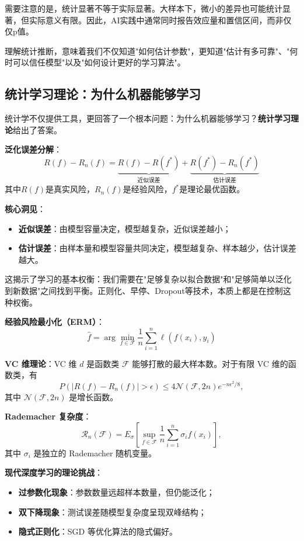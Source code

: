 需要注意的是，统计显著不等于实际显著。大样本下，微小的差异也可能统计显著，但实际意义有限。因此，AI实践中通常同时报告效应量和置信区间，而非仅仅p值。

理解统计推断，意味着我们不仅知道"如何估计参数"，更知道"估计有多可靠"、"何时可以信任模型"以及"如何设计更好的学习算法"。

\subsection{统计学习理论：为什么机器能够学习}

统计学不仅提供工具，更回答了一个根本问题：为什么机器能够学习？\textbf{统计学习理论}给出了答案。

\textbf{泛化误差分解}：
\begin{equation}
R(f) - R_n(f) = \underbrace{R(f) - R(f^*)}_{\text{近似误差}} + \underbrace{R(f^*) - R_n(f^*)}_{\text{估计误差}}
\end{equation}
其中$R(f)$是真实风险，$R_n(f)$是经验风险，$f^*$是理论最优函数。

\textbf{核心洞见}：
\begin{itemize}
  \item \textbf{近似误差}：由模型容量决定，模型越复杂，近似误差越小；
  \item \textbf{估计误差}：由样本量和模型容量共同决定，模型越复杂、样本越少，估计误差越大。
\end{itemize}

这揭示了学习的基本权衡：我们需要在"足够复杂以拟合数据"和"足够简单以泛化到新数据"之间找到平衡。正则化、早停、Dropout等技术，本质上都是在控制这种权衡。

\textbf{经验风险最小化（ERM）}：
$$\hat{f} = \arg\min_{f \in \mathcal{F}} \frac{1}{n}\sum_{i=1}^n \ell(f(x_i), y_i)$$

\textbf{VC 维理论}：VC 维 $d$ 是函数类 $\mathcal{F}$ 能够打散的最大样本数。对于有限 VC 维的函数类，有
$$
P\left(|R(f) - R_n(f)| > \epsilon\right) \leq 4\mathcal{N}(\mathcal{F}, 2n)e^{-n\epsilon^2/8},
$$
其中 $\mathcal{N}(\mathcal{F}, 2n)$ 是增长函数。

\textbf{Rademacher 复杂度}：
$$
\mathcal{R}_n(\mathcal{F}) = E_{\sigma}\left[\sup_{f \in \mathcal{F}} \frac{1}{n}\sum_{i=1}^n \sigma_i f(x_i)\right],
$$
其中 $\sigma_i$ 是独立的 Rademacher 随机变量。

\textbf{现代深度学习的理论挑战}：
\begin{itemize}
  \item \textbf{过参数化现象}：参数数量远超样本数量，但仍能泛化；
  \item \textbf{双下降现象}：测试误差随模型复杂度呈现双峰结构；
  \item \textbf{隐式正则化}：SGD 等优化算法的隐式偏好。
\end{itemize}

